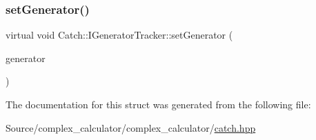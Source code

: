 \subsubsection{\texorpdfstring{set\+Generator()}{setGenerator()}}
{\footnotesize\ttfamily virtual void Catch\+::\+I\+Generator\+Tracker\+::set\+Generator (\begin{DoxyParamCaption}\item[{\mbox{\hyperlink{namespace_catch_1_1_generators_a1519f304113619d7d18670e2f08276c0}{Generators\+::\+Generator\+Base\+Ptr}} \&\&}]{generator }\end{DoxyParamCaption})\hspace{0.3cm}{\ttfamily [pure virtual]}}



The documentation for this struct was generated from the following file\+:\begin{DoxyCompactItemize}
\item 
Source/complex\+\_\+calculator/complex\+\_\+calculator/\mbox{\hyperlink{catch_8hpp}{catch.\+hpp}}\end{DoxyCompactItemize}
